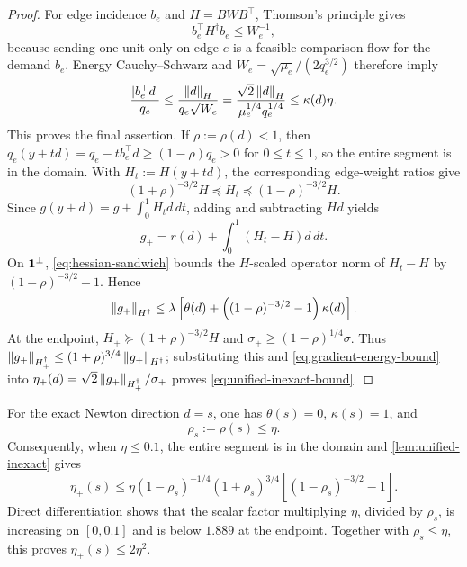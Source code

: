\begin{proof}
For edge incidence $b_e$ and $H=BW B^\top$, Thomson's principle gives
\begin{equation}
 b_e^\top H^\dagger b_e\le W_e^{-1},
 \label{eq:resistance}
\end{equation}
because sending one unit only on edge $e$ is a feasible comparison flow for
the demand $b_e$.  Energy Cauchy--Schwarz and
$W_e=\sqrt{\mu_e}/(2q_e^{3/2})$ therefore imply
\begin{equation}
 \frac{|b_e^\top d|}{q_e}
 \le \frac{\left\lVert d\right\rVert_H}{q_e\sqrt{W_e}}
 =\frac{\sqrt2\left\lVert d\right\rVert_H}{\mu_e^{1/4}q_e^{1/4}}
 \le\kappa(d)\eta.
 \label{eq:relative-direction-bound}
\end{equation}
This proves the final assertion.  If $\rho:=\rho(d)<1$, then
$q_e(y+td)=q_e-tb_e^\top d\ge(1-\rho)q_e>0$ for $0\le t\le1$, so the entire
segment is in the domain.  With $H_t:=H(y+td)$, the corresponding edge-weight
ratios give
\begin{equation}
 (1+\rho)^{-3/2}H\preceq H_t
 \preceq(1-\rho)^{-3/2}H.
 \label{eq:hessian-sandwich}
\end{equation}
Since $g(y+d)=g+\int_0^1H_t d\,dt$, adding and subtracting $Hd$ yields
\begin{equation}
 g_+=r(d)+\int_0^1(H_t-H)d\,dt.
 \label{eq:gradient-integral}
\end{equation}
On $\mathbf{1}^\perp$, 
\cref{eq:hessian-sandwich} bounds the $H$-scaled operator norm of
$H_t-H$ by $(1-\rho)^{-3/2}-1$.  Hence
\begin{equation}
 \left\lVert g_+\right\rVert_{H^\dagger}
 \le\lambda\left[\theta(d)+
 \left((1-\rho)^{-3/2}-1\right)\kappa(d)\right].
 \label{eq:gradient-energy-bound}
\end{equation}
At the endpoint, 
$H_+\succeq(1+\rho)^{-3/2}H$ and
$\sigma_+\ge(1-\rho)^{1/4}\sigma$.  Thus
$\left\lVert g_+\right\rVert_{H_+^\dagger}\le
(1+\rho)^{3/4}\left\lVert g_+\right\rVert_{H^\dagger}$; substituting this and
\cref{eq:gradient-energy-bound} into
$\eta_+(d)=\sqrt2\left\lVert g_+\right\rVert_{H_+^\dagger}/\sigma_+$ proves
\cref{eq:unified-inexact-bound}.
\end{proof}

For the exact Newton direction $d=s$, one has
$\theta(s)=0$, $\kappa(s)=1$, and
\begin{equation}
 \rho_s:=\rho(s)\le\eta.
 \label{eq:exact-relative-step}
\end{equation}
Consequently, when $\eta\le0.1$, the entire segment is in the domain and
\cref{lem:unified-inexact} gives
\begin{equation}
 \eta_+(s)\le
 \eta(1-\rho_s)^{-1/4}(1+\rho_s)^{3/4}
 \left[(1-\rho_s)^{-3/2}-1\right].
 \label{eq:exact-eta-update}
\end{equation}
Direct differentiation shows that the scalar factor multiplying $\eta$, divided
by $\rho_s$, is increasing on $[0,0.1]$ and is below $1.889$ at the endpoint.
Together with $\rho_s\le\eta$, this proves
$\eta_+(s)\le2\eta^2$.

